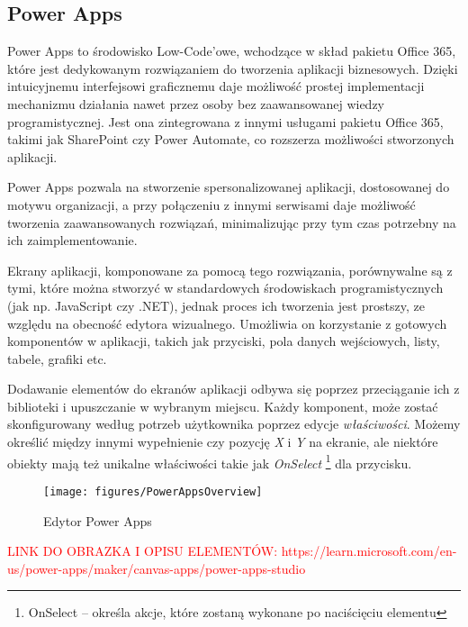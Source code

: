 \subsection{Power Apps}

Power Apps to środowisko Low-Code'owe, wchodzące w skład pakietu Office 365, które jest dedykowanym rozwiązaniem do tworzenia aplikacji biznesowych. Dzięki intuicyjnemu interfejsowi graficznemu daje możliwość prostej implementacji mechanizmu działania nawet przez osoby bez zaawansowanej wiedzy programistycznej. Jest ona zintegrowana z innymi usługami pakietu Office 365, takimi jak SharePoint czy Power Automate, co rozszerza możliwości stworzonych aplikacji.

Power Apps pozwala na stworzenie spersonalizowanej aplikacji, dostosowanej do motywu organizacji, a przy połączeniu z innymi serwisami daje możliwość tworzenia zaawansowanych rozwiązań, minimalizując przy tym czas potrzebny na ich zaimplementowanie.

Ekrany aplikacji, komponowane za pomocą tego rozwiązania, porównywalne są z tymi, które można stworzyć w standardowych środowiskach programistycznych (jak np. JavaScript czy .NET), jednak proces ich tworzenia jest prostszy, ze względu na obecność edytora wizualnego. Umożliwia on korzystanie z gotowych komponentów w aplikacji, takich jak przyciski, pola danych wejściowych, listy, tabele, grafiki etc.

Dodawanie elementów do ekranów aplikacji odbywa się poprzez przeciąganie ich z biblioteki i upuszczanie w wybranym miejscu. Każdy komponent, może zostać skonfigurowany według potrzeb użytkownika poprzez edycje \emph{właściwości}. Możemy określić między innymi wypełnienie czy pozycję \emph{X} i \emph{Y} na ekranie, ale niektóre obiekty mają też unikalne właściwości takie jak \emph{OnSelect} \footnote{OnSelect -- określa akcje, które zostaną wykonane po naciścięciu elementu} dla przycisku.


\newpage

\begin{figure}[h] %
    \centering
    \texttt{[image: figures/PowerAppsOverview]}
    \caption{Edytor Power Apps}
    \label{fig:PowerAppsEditorOverview}
\end{figure}
\textcolor{red}{LINK DO OBRAZKA I OPISU ELEMENTÓW: https://learn.microsoft.com/en-us/power-apps/maker/canvas-apps/power-apps-studio}

